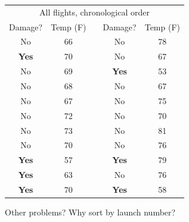 \documentclass[pdflatex,landscape,titlepage]{foils}
\begin{document}
\begin{center}
\begin{tabular}{ccccc}
\toprule
\multicolumn{5}{c}{All flights, chronological order}\\
Damage? &       Temp (F)        &      \quad \quad \quad        &       Damage? &       Temp (F)        \\
\midrule
No      &       66      &               &       No      &       78      \\
\textbf{Yes}    &       70      &               &       No      &       67      \\
No      &       69      &               &        \textbf{Yes}    &        53      \\
No      &       68      &               &       No      &       67      \\
No      &       67      &               &       No      &       75      \\
No      &       72      &               &       No      &       70      \\
No      &       73      &               &       No      &       81      \\
No      &       70      &               &       No      &       76      \\
 \textbf{Yes}    &        57      &               &        \textbf{Yes}    &        79      \\
 \textbf{Yes}    &        63      &               &       No      &       76      \\
 \textbf{Yes}    &        70      &               &        \textbf{Yes}    &        58      \\
\bottomrule
\end{tabular}
\end{center}

Other problems?   Why sort by launch number?

\end{document}
